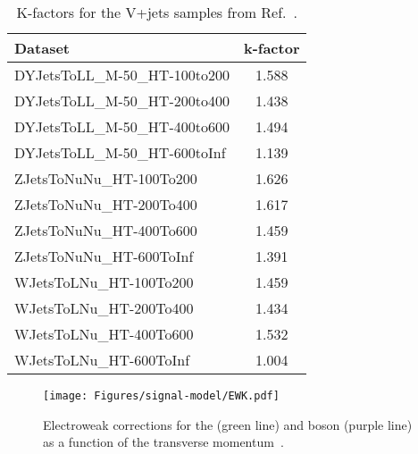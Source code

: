 \begin{table}[!htb]\centering
\caption{K-factors for the V+jets samples from Ref.~\cite{AN-2015-186}. \label{tab:kfactors}}
\begin{tabular}{lc}
 \hline
 Dataset & k-factor \\
 \hline
DYJetsToLL\_M-50\_HT-100to200 & 1.588 \\
DYJetsToLL\_M-50\_HT-200to400 & 1.438 \\
DYJetsToLL\_M-50\_HT-400to600 & 1.494 \\
DYJetsToLL\_M-50\_HT-600toInf & 1.139 \\
\hline
ZJetsToNuNu\_HT-100To200 & 1.626 \\
ZJetsToNuNu\_HT-200To400 & 1.617 \\
ZJetsToNuNu\_HT-400To600 & 1.459 \\
ZJetsToNuNu\_HT-600ToInf & 1.391 \\
\hline
WJetsToLNu\_HT-100To200 & 1.459 \\
WJetsToLNu\_HT-200To400 & 1.434 \\
WJetsToLNu\_HT-400To600 & 1.532 \\
WJetsToLNu\_HT-600ToInf & 1.004 \\
\hline
\end{tabular}
\end{table}


\begin{figure}[!htb]
 \centering
   \texttt{[image: Figures/signal-model/EWK.pdf]}
 \caption{Electroweak corrections for the \Z (green line) and \PW boson (purple line) as a function of the transverse momentum~\cite{Kallweit:2015dum}.}
 \label{fig:ewk}
\end{figure}
	 


